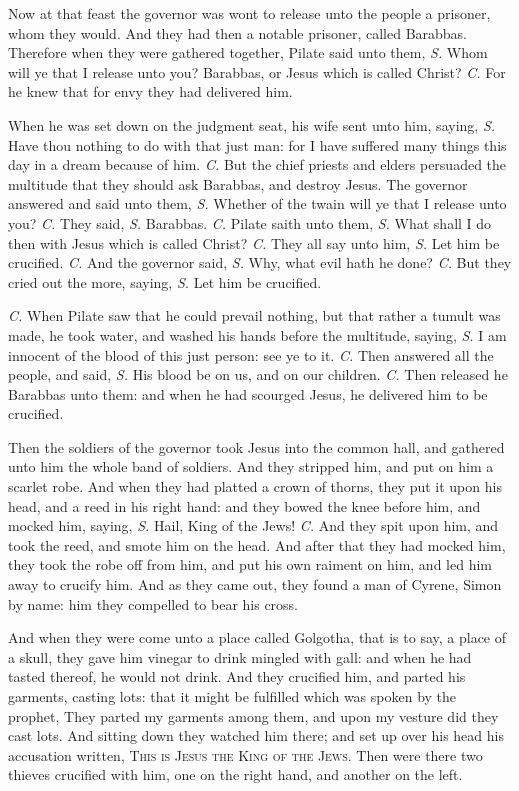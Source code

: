 Now at that feast the governor was wont to release unto the people a prisoner, whom they would. And they had then a notable prisoner, called Barabbas. Therefore when they were gathered together, Pilate said unto them, \textit{S.} Whom will ye that I release unto you? Barabbas, or Jesus which is called Christ? \textit{C.} For he knew that for envy they had delivered him.

When he was set down on the judgment seat, his wife sent unto him, saying, \textit{S.} Have thou nothing to do with that just man: for I have suffered many things this day in a dream because of him. \textit{C.} But the chief priests and elders persuaded the multitude that they should ask Barabbas, and destroy Jesus. The governor answered and said unto them, \textit{S.} Whether of the twain will ye that I release unto you? \textit{C.} They said, \textit{S.} Barabbas. \textit{C.} Pilate saith unto them, \textit{S.} What shall I do then with Jesus which is called Christ? \textit{C.} They all say unto him, \textit{S.} Let him be crucified. \textit{C.} And the governor said, \textit{S.} Why, what evil hath he done? \textit{C.} But they cried out the more, saying, \textit{S.} Let him be crucified.

\textit{C.} When Pilate saw that he could prevail nothing, but that rather a tumult was made, he took water, and washed his hands before the multitude, saying, \textit{S.} I am innocent of the blood of this just person: see ye to it. \textit{C.} Then answered all the people, and said, \textit{S.} His blood be on us, and on our children. \textit{C.} Then released he Barabbas unto them: and when he had scourged Jesus, he delivered him to be crucified.

Then the soldiers of the governor took Jesus into the common hall, and gathered unto him the whole band of soldiers. And they stripped him, and put on him a scarlet robe. And when they had platted a crown of thorns, they put it upon his head, and a reed in his right hand: and they bowed the knee before him, and mocked him, saying, \textit{S.} Hail, King of the Jews! \textit{C.} And they spit upon him, and took the reed, and smote him on the head. And after that they had mocked him, they took the robe off from him, and put his own raiment on him, and led him away to crucify him. And as they came out, they found a man of Cyrene, Simon by name: him they compelled to bear his cross.

And when they were come unto a place called Golgotha, that is to say, a place of a skull, they gave him vinegar to drink mingled with gall: and when he had tasted thereof, he would not drink. And they crucified him, and parted his garments, casting lots: that it might be fulfilled which was spoken by the prophet, They parted my garments among them, and upon my vesture did they cast lots. And sitting down they watched him there; and set up over his head his accusation written, \textsc{This is Jesus the King of the Jews}. Then were there two thieves crucified with him, one on the right hand, and another on the left.

